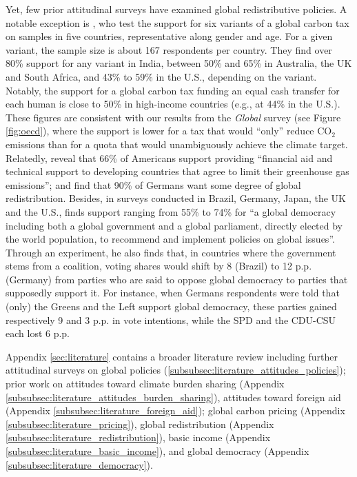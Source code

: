 Yet, few prior attitudinal surveys have examined global redistributive policies. 
A notable exception is \citet{carattini_how_2019}, who test the support for six variants of a global carbon tax on samples in five countries, representative along gender and age. For a given variant, the sample size is about 167 respondents per country. They find over 80\% support for any variant in India, between 50\% and 65\% in Australia, the UK and South Africa, and 43\% to 59\% in the U.S., depending on the variant. Notably, the support for a global carbon tax funding an equal cash transfer for each human is close to 50\% in high-income countries (e.g., at 44\% in the U.S.). These figures are consistent with our results from the \textit{Global} survey (see Figure \ref{fig:oecd}), where the support is lower for a tax that would ``only'' reduce CO$_\text{2}$ emissions than for a quota that would unambiguously achieve the climate target. 
Relatedly, \cite{leiserowitz_public_2021} reveal that 66\% of Americans support providing ``financial aid and technical support to developing countries that agree to limit their greenhouse gas emissions''; and \citet{fehr_your_2022} find that 90\% of Germans want some degree of global redistribution. 
Besides, in surveys conducted in Brazil, Germany, Japan, the UK and the U.S., \citet{ghassim_who_2020} finds support ranging from 55\% to 74\% for ``a global democracy including both a global government and a global parliament, directly elected by the world population, to recommend and implement policies on global issues''. %
Through an experiment, he also finds that, in countries where the government stems from a coalition, voting shares would shift by 8 (Brazil) to 12 p.p. (Germany) from parties who are said to oppose global democracy to parties that supposedly support it. For instance, when Germans respondents were told that (only) the Greens and the Left support global democracy, these parties gained respectively 9 and 3 p.p. in vote intentions, while the SPD and the CDU-CSU each lost 6 p.p. 

Appendix \ref{sec:literature} contains a broader literature review including further attitudinal surveys on global policies (\ref{subsubsec:literature_attitudes_policies}); prior work on attitudes toward climate burden sharing (Appendix \ref{subsubsec:literature_attitudes_burden_sharing}), attitudes toward foreign aid (Appendix \ref{subsubsec:literature_foreign_aid}); global carbon pricing (Appendix \ref{subsubsec:literature_pricing}), global redistribution (Appendix \ref{subsubsec:literature_redistribution}), basic income (Appendix \ref{subsubsec:literature_basic_income}), and global democracy (Appendix \ref{subsubsec:literature_democracy}).

